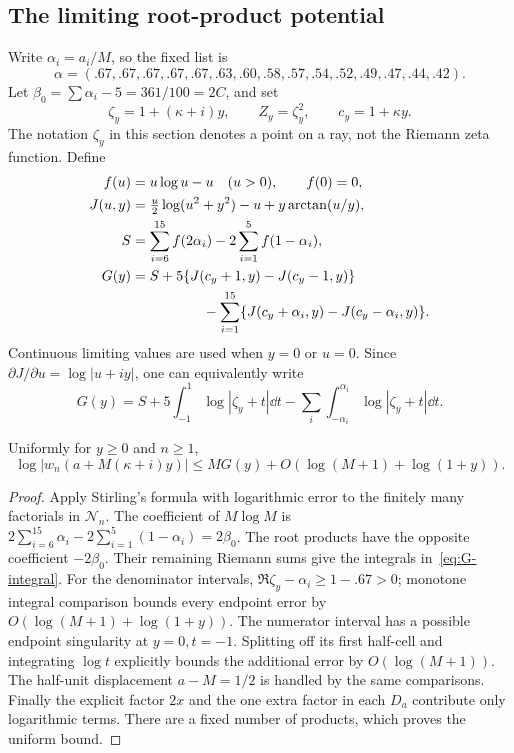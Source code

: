 \subsection{The limiting root-product potential}
Write $\alpha_i=a_i/M$, so the fixed list is
\[
 \alpha=(.67,.67,.67,.67,.67,.63,.60,.58,.57,.54,.52,.49,.47,.44,.42).
\]
Let $\beta_0=\sum\alpha_i-5=361/100=2C$, and set
\[
 \zeta_y=1+(\kappa+i)y,\qquad Z_y=\zeta_y^2,\qquad c_y=1+\kappa y.
\]
The notation $\zeta_y$ in this section denotes a point on a ray, not
the Riemann zeta function.  Define
\begin{align}
 f(u)&=u\log u-u\quad(u>0),\qquad f(0)=0,\notag\\
 J(u,y)&=\tfrac u2\log(u^2+y^2)-u+y\arctan(u/y),\notag\\
 S&=\sum_{i=6}^{15}f(2\alpha_i)-2\sum_{i=1}^{5}f(1-\alpha_i),\label{eq:S}\\
 G(y)&=S+5\{J(c_y+1,y)-J(c_y-1,y)\}\notag\\
 &\hspace{18mm}-\sum_{i=1}^{15}\{J(c_y+\alpha_i,y)-J(c_y-\alpha_i,y)\}.
 \label{eq:G}
\end{align}
Continuous limiting values are used when $y=0$ or $u=0$.
Since $\partial J/\partial u=\log|u+iy|$, one can equivalently write
\begin{equation}\label{eq:G-integral}
 G(y)=S+5\int_{-1}^{1}\log|\zeta_y+t|\dd t
                -\sum_i\int_{-\alpha_i}^{\alpha_i}\log|\zeta_y+t|\dd t.
\end{equation}

\begin{lemma}\label{lem:weight-potential}
Uniformly for $y\ge0$ and $n\ge1$,
\begin{equation}\label{eq:weight-potential}
 \log|w_n(a+M(\kappa+i)y)|
 \le MG(y)+O(\log(M+1)+\log(1+y)).
\end{equation}
\end{lemma}
\begin{proof}
Apply Stirling's formula with logarithmic error to the finitely many
factorials in $\mathcal N_n$.  The coefficient of $M\log M$ is
$2\sum_{i=6}^{15}\alpha_i-2\sum_{i=1}^{5}(1-\alpha_i)=2\beta_0$.
The root products have the opposite coefficient $-2\beta_0$.
Their remaining Riemann sums give the integrals in~\eqref{eq:G-integral}.
For the denominator intervals, $\Re\zeta_y-\alpha_i\ge1-.67>0$;
monotone integral comparison bounds every endpoint error by
$O(\log(M+1)+\log(1+y))$.  The numerator interval has a possible
endpoint singularity at $y=0,t=-1$.  Splitting off its first half-cell
and integrating $\log t$ explicitly bounds the additional error by
$O(\log(M+1))$.  The half-unit displacement $a-M=1/2$ is handled by
the same comparisons.  Finally the explicit factor $2x$ and the
one extra factor in each $D_a$ contribute only logarithmic terms.
There are a fixed number of products, which proves the uniform bound.
\end{proof}

